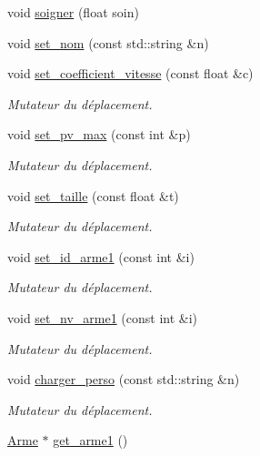 \begin{DoxyCompactItemize}
\item 
void \hyperlink{classPerso_a26cb7f4235726561a55d6feb585cf789}{soigner} (float soin)
\item 
void \hyperlink{classPerso_a072d564a8bca3b10d03acbffc9dacfea}{set\+\_\+nom} (const std\+::string \&n)
\item 
void \hyperlink{classPerso_aa687e5caeb62f90622ad1a09e4e95380}{set\+\_\+coefficient\+\_\+vitesse} (const float \&c)
\begin{DoxyCompactList}\small\item\em Mutateur du déplacement. \end{DoxyCompactList}\item 
void \hyperlink{classPerso_a197f7c4a5ca9677ebc597a56b64d066c}{set\+\_\+pv\+\_\+max} (const int \&p)
\begin{DoxyCompactList}\small\item\em Mutateur du déplacement. \end{DoxyCompactList}\item 
void \hyperlink{classPerso_aba25d0e7ca796d4b5f05b9a4ff34d239}{set\+\_\+taille} (const float \&t)
\begin{DoxyCompactList}\small\item\em Mutateur du déplacement. \end{DoxyCompactList}\item 
void \hyperlink{classPerso_ac6538c0cccd1f7703fabadf491737a41}{set\+\_\+id\+\_\+arme1} (const int \&i)
\begin{DoxyCompactList}\small\item\em Mutateur du déplacement. \end{DoxyCompactList}\item 
void \hyperlink{classPerso_a4f35ce41db777a555946a52609a48ee3}{set\+\_\+nv\+\_\+arme1} (const int \&i)
\begin{DoxyCompactList}\small\item\em Mutateur du déplacement. \end{DoxyCompactList}\item 
void \hyperlink{classPerso_a12d61850ed6d9e1ce8da1b95a976e5cb}{charger\+\_\+perso} (const std\+::string \&n)
\begin{DoxyCompactList}\small\item\em Mutateur du déplacement. \end{DoxyCompactList}\item 
\hyperlink{classArme}{Arme} $\ast$ \hyperlink{classPerso_aa8e41cc8879e7aaccfd2b378a0015ebc}{get\+\_\+arme1} ()
\item 

\end{DoxyCompactItemize}
